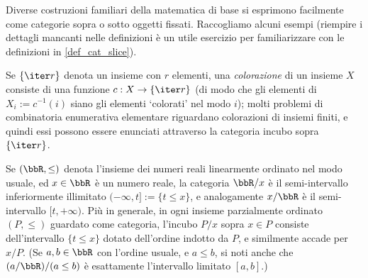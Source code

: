 Diverse costruzioni familiari della matematica di base si esprimono facilmente come categorie sopra o sotto oggetti fissati. Raccogliamo alcuni esempi (riempire i dettagli mancanti nelle definizioni è un utile esercizio per familiarizzare con le definizioni in \ref{def_cat_slice}).
\begin{example}\label{ex_set_colorati}
	Se \(\{\iter r\}\) denota un insieme con \(r\) elementi, una \emph{colorazione} di un insieme \(X\) consiste di una funzione \(c : X \to \{\iter r\}\) (di modo che gli elementi di \(X_i := c^{-1}(i)\) siano gli elementi `colorati' nel modo \(i\)); molti problemi di combinatoria enumerativa elementare riguardano colorazioni di insiemi finiti, e quindi essi possono essere enunciati attraverso la categoria incubo sopra \(\{\iter r\}\).
\end{example}
\begin{example}[Intervalli]\label{ex_pos_slices}
	Se \((\bbR,\le)\) denota l'insieme dei numeri reali linearmente ordinato nel modo usuale, ed \(x\in\bbR\) è un numero reale, la categoria \(\bbR/x\) è il semi-intervallo inferiormente illimitato \((-\infty,t]:=\{t\le x\}\), e analogamente \(x/\bbR\) è il semi-intervallo \([t,+\infty)\). Più in generale, in ogni insieme parzialmente ordinato \((P,\le)\) guardato come categoria, l'incubo \(P/x\) sopra \(x\in P\) consiste dell'intervallo \(\{t\le x\}\) dotato dell'ordine indotto da \(P\), e similmente accade per \(x/P\). (Se \(a,b\in\bbR\) con l'ordine usuale, e \(a\le b\), si noti anche che \((a/\bbR)/(a\le b)\) è esattamente l'intervallo limitato \([a,b]\).)
\end{example}
